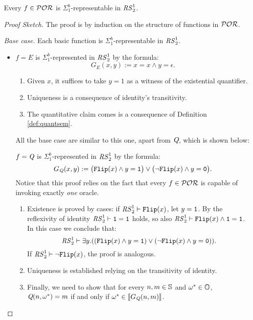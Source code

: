 \begin{theorem}\label{theorem1}
Every $f\in \mathcal{POR}$ is $\Sigma^b_1$-representable in
${\mathit{RS}^1_2}$.
\end{theorem}
\begin{proof}[Proof Sketch]
The proof is by induction on the
structure of functions in $\mathcal{POR}$.



\emph{Base case.}
Each basic function
is $\Sigma^b_1$-representable in ${\mathit{RS}^1_2}$.

\begin{itemize}
\item
$f=E$ is $\Sigma^b_1$-represented
in ${\mathit{RS}^1_2}$ by the formula:
$$
G_E(x,y) := x = x \wedge y=\epsilon.
$$

\begin{enumerate}
\item Given $x$, it suffices to take $y=1$ as a witness of the existential quantifier.
\item Uniqueness is a consequence of identity's transitivity.

\item The quantitative claim comes is a consequence of Definition \ref{def:quantsem}.

\end{enumerate}

All the base case are similar to this one, apart from $\emph{Q}$, which is shown below:




\bigskip
$f=\emph{Q}$ is
$\Sigma^b_1$-represented in ${\mathit{RS}^1_2}$
by the formula:
$$
G_{\emph{Q}}(x,y) := \big(\mathtt{Flip}(x) \wedge y=\mathtt{1}\big) \vee
\big(\neg\mathtt{Flip}(x) \wedge y=\mathtt{0}\big).
$$
Notice that this proof relies on the fact that every $f\in \mathcal{POR}$
is capable of invoking exactly \emph{one} oracle.
\begin{enumerate}
\item Existence is proved by cases: if ${\mathit{RS}^1_2}\vdash\mathtt{Flip}(x)$,
let $y=\mathtt{1}$.
By the reflexivity of identity
${\mathit{RS}^1_2}\vdash\mathtt{1}=\mathtt{1}$ holds,
so also ${\mathit{RS}^1_2}\vdash \mathtt{Flip}(x) \wedge \mathtt{1}=\mathtt{1}$.
In this case we conclude that:
$$
{\mathit{RS}^1_2}
\vdash \exists y.((\mathtt{Flip}(x)
\wedge y=\mathtt{1}) \vee
(\neg\mathtt{Flip}(x) \wedge y=\mathtt{0})).
$$
%
If ${\mathit{RS}^1_2}\vdash \neg \mathtt{Flip}(x)$, the proof is analogous.
\item Uniqueness is established relying on the
transitivity of identity.

\item Finally, we need to show that for every
$n,m\in \mathbb{S}$ and $\omega^*\in \mathbb{O}$,
$\emph{Q}(n,\omega^*)=m$
if and only if
$\omega^* \in \llbracket G_{\emph{Q}}({n},{m})\rrbracket$.


\end{enumerate}
\end{itemize}
\end{proof}
